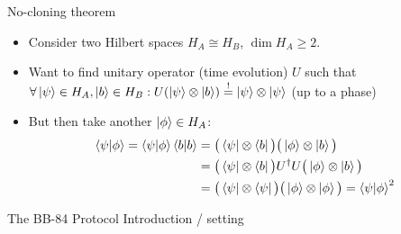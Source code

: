 \documentclass{beamer}
\begin{document}
	\begin{frame}{No-cloning theorem}
		\begin{itemize}
			\item Consider two Hilbert spaces $H_A \cong H_B$,
			$\operatorname{dim}H_A \geq 2$.

			\item<2-> Want to find unitary operator (time evolution) $U$
			such that $\forall \ket{\psi} \in H_A, \ket{b} \in H_B: U(\ket{\psi} \otimes \ket{b}) \overset{!}{=} \ket{\psi} \otimes \ket{\psi}$ (up to a phase)
			
			\item<3-> But then take another $\ket{\phi} \in H_A$:
				\begin{align*}
					\braket{\psi|\phi} = \braket{\psi|\phi}\braket{b|b} &= \big(\bra{\psi} \otimes \bra{b}\big) \big(\ket{\phi} \otimes \ket{b}\big) \\
					&= \big(\bra{\psi} \otimes \bra{b}\big) U^\dagger U \big(\ket{\phi} \otimes \ket{b}\big) \\
					&= \big(\bra{\psi} \otimes \bra{\psi}\big) \big(\ket{\phi} \otimes \ket{\phi}\big)
					= \braket{\psi|\phi}^2
				\end{align*}



		\end{itemize}
	\end{frame}

	\begin{frame}{The BB-84 Protocol} %
		Introduction / setting
	\end{frame}
\end{document}
